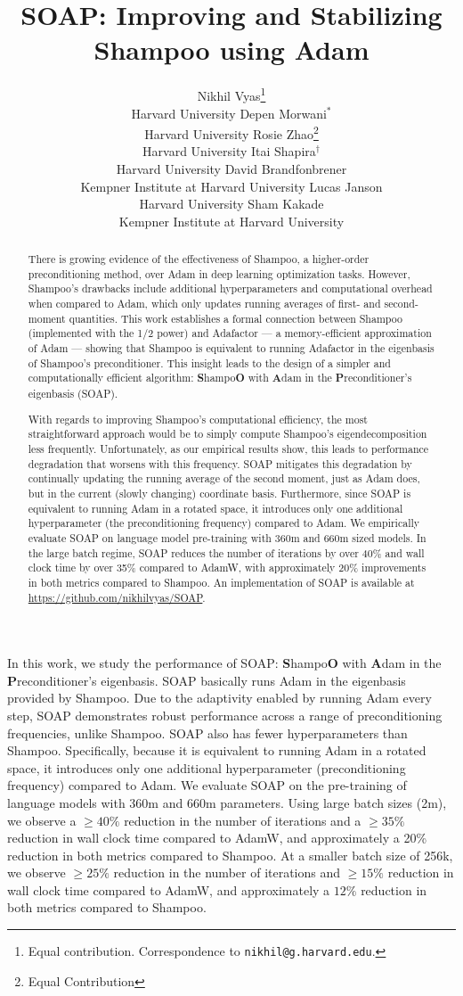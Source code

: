 \documentclass{article} %
\title{SOAP: Improving and Stabilizing Shampoo using Adam}
\author{
Nikhil Vyas\thanks{Equal contribution. Correspondence to \texttt{nikhil@g.harvard.edu}.}\\
Harvard University
\And
Depen Morwani$^*$\\
Harvard University
\And
Rosie Zhao\thanks{Equal Contribution}\\
Harvard University
\And
Itai Shapira$^\dagger$\\
Harvard University
\And
David Brandfonbrener\\
Kempner Institute at Harvard University
\And
Lucas Janson\\
Harvard University
\And 
Sham Kakade\\
Kempner Institute at Harvard University
}
\begin{document}
\maketitle

\begin{abstract}
There is growing evidence of the effectiveness of Shampoo, a higher-order preconditioning method, over Adam in deep learning optimization tasks. However, Shampoo's drawbacks include additional hyperparameters and computational overhead when compared to Adam, which only updates running averages of first- and second-moment quantities. This work establishes a formal connection between Shampoo (implemented with the 1/2 power) and Adafactor --- a memory-efficient approximation of Adam --- showing that Shampoo is equivalent to running Adafactor in the eigenbasis of Shampoo's preconditioner. This insight leads to the design of a simpler and computationally efficient algorithm: \textbf{S}hampo\textbf{O} with \textbf{A}dam in the \textbf{P}reconditioner's eigenbasis (SOAP).

With regards to improving Shampoo's computational efficiency, the most straightforward approach would be to simply compute Shampoo's eigendecomposition less frequently. 
Unfortunately, as our empirical results show, this leads to performance degradation that worsens with this frequency.
SOAP mitigates this degradation by continually updating the running average of the second moment, just as Adam does, but in the current (slowly changing) coordinate basis. Furthermore, since SOAP is equivalent to running Adam in a rotated space, it introduces only one additional hyperparameter (the preconditioning frequency) compared to Adam. We empirically evaluate SOAP on language model pre-training with 360m and 660m sized models. In the large batch regime, SOAP reduces the number of iterations by over 40\% and wall clock time by over 35\% compared to AdamW, with approximately 20\% improvements in both metrics compared to Shampoo. An implementation of SOAP is available at \url{https://github.com/nikhilvyas/SOAP}.
\end{abstract}

\iffalse
In this work, we study the performance of SOAP: \textbf{S}hampo\textbf{O} with \textbf{A}dam in the \textbf{P}reconditioner's eigenbasis. SOAP basically runs Adam in the eigenbasis provided by Shampoo. Due to the adaptivity enabled by running Adam every step, SOAP demonstrates robust performance across a range of preconditioning frequencies, unlike Shampoo. SOAP also has fewer hyperparameters than Shampoo. Specifically, because it is equivalent to running Adam in a rotated space, it introduces only one additional hyperparameter (preconditioning frequency) compared to Adam. We evaluate SOAP on the pre-training of language models with 360m and 660m parameters. Using large batch sizes (2m), we observe a $\geq 40\%$ reduction in the number of iterations and a $\geq 35\%$ reduction in wall clock time compared to AdamW, and approximately a 20\% reduction in both metrics compared to Shampoo. At a smaller batch size of 256k, we observe $\geq 25\%$ reduction in the number of iterations and $\geq 15\%$ reduction in wall clock time compared to AdamW, and approximately a $12 \%$ reduction in both metrics compared to Shampoo.
\end{document}
